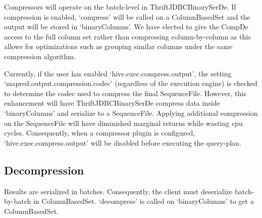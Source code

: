 \documentclass[11pt,a4paper]{article}
\begin{document}
		Compressors will operate on the batch-level in ThriftJDBCBinarySerDe.
		If compression is enabled, `compress' will be called on a ColumnBasedSet and the output will be stored in `binaryColumns'.
		We have elected to give the CompDe access to the full column set rather than compressing column-by-column as this allows for optimizations such as grouping similar columns under the same compression algorithm.
		
		Currently, if the user has enabled `hive.exec.compress.output', the setting `mapred.output.compression.codec' (regardless of the execution engine) is checked to determine the codec used to compress the final SequenceFile.
		However, this enhancement will have ThriftJDBCBinarySerDe compress data inside `binaryColumns' and serialize to a SequenceFile.
		Applying additional compression on the SequenceFile will have diminished marginal returns while wasting cpu cycles.
		Consequently, when a compressor plugin is configured,  `hive.exec.compress.output' will be disabled before executing the query-plan.
		
		\subsection{Decompression}
		Results are serialized in batches.
		Consequently, the client must deserialize batch-by-batch in ColumnBasedSet.
		`decompress' is called on `binaryColumns' to get a ColumnBasedSet.
		
\end{document}
